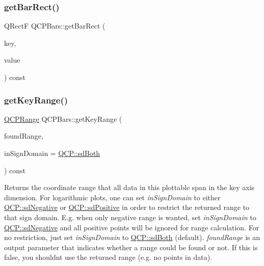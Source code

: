 \subsubsection{\texorpdfstring{get\+Bar\+Rect()}{getBarRect()}}
{\footnotesize\ttfamily Q\+RectF Q\+C\+P\+Bars\+::get\+Bar\+Rect (\begin{DoxyParamCaption}\item[{double}]{key,  }\item[{double}]{value }\end{DoxyParamCaption}) const\hspace{0.3cm}{\ttfamily [protected]}}

\mbox{\label{class_q_c_p_bars_ac5a3854774d9d9cd129b1eae1426de2d}} 
\subsubsection{\texorpdfstring{get\+Key\+Range()}{getKeyRange()}}
{\footnotesize\ttfamily \hyperlink{class_q_c_p_range}{Q\+C\+P\+Range} Q\+C\+P\+Bars\+::get\+Key\+Range (\begin{DoxyParamCaption}\item[{bool \&}]{found\+Range,  }\item[{\hyperlink{namespace_q_c_p_afd50e7cf431af385614987d8553ff8a9}{Q\+C\+P\+::\+Sign\+Domain}}]{in\+Sign\+Domain = {\ttfamily \hyperlink{namespace_q_c_p_afd50e7cf431af385614987d8553ff8a9aa38352ef02d51ddfa4399d9551566e24}{Q\+C\+P\+::sd\+Both}} }\end{DoxyParamCaption}) const\hspace{0.3cm}{\ttfamily [virtual]}}

Returns the coordinate range that all data in this plottable span in the key axis dimension. For logarithmic plots, one can set {\itshape in\+Sign\+Domain} to either \hyperlink{namespace_q_c_p_afd50e7cf431af385614987d8553ff8a9a2d18af0bc58f6528d1e82ce699fe4829}{Q\+C\+P\+::sd\+Negative} or \hyperlink{namespace_q_c_p_afd50e7cf431af385614987d8553ff8a9a584784b75fb816abcc627cf743bb699f}{Q\+C\+P\+::sd\+Positive} in order to restrict the returned range to that sign domain. E.\+g. when only negative range is wanted, set {\itshape in\+Sign\+Domain} to \hyperlink{namespace_q_c_p_afd50e7cf431af385614987d8553ff8a9a2d18af0bc58f6528d1e82ce699fe4829}{Q\+C\+P\+::sd\+Negative} and all positive points will be ignored for range calculation. For no restriction, just set {\itshape in\+Sign\+Domain} to \hyperlink{namespace_q_c_p_afd50e7cf431af385614987d8553ff8a9aa38352ef02d51ddfa4399d9551566e24}{Q\+C\+P\+::sd\+Both} (default). {\itshape found\+Range} is an output parameter that indicates whether a range could be found or not. If this is false, you shouldn\textquotesingle{}t use the returned range (e.\+g. no points in data).

